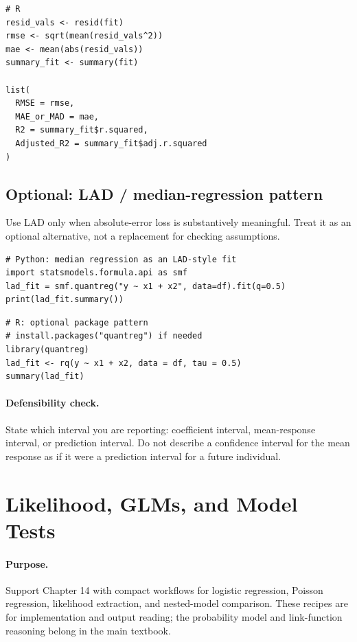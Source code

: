 \begin{verbatim}
# R
resid_vals <- resid(fit)
rmse <- sqrt(mean(resid_vals^2))
mae <- mean(abs(resid_vals))
summary_fit <- summary(fit)

list(
  RMSE = rmse,
  MAE_or_MAD = mae,
  R2 = summary_fit$r.squared,
  Adjusted_R2 = summary_fit$adj.r.squared
)
\end{verbatim}

\subsection*{Optional: LAD / median-regression pattern}

Use LAD only when absolute-error loss is substantively meaningful.  Treat it as an optional alternative, not a replacement for checking assumptions.

\begin{verbatim}
# Python: median regression as an LAD-style fit
import statsmodels.formula.api as smf
lad_fit = smf.quantreg("y ~ x1 + x2", data=df).fit(q=0.5)
print(lad_fit.summary())
\end{verbatim}

\begin{verbatim}
# R: optional package pattern
# install.packages("quantreg") if needed
library(quantreg)
lad_fit <- rq(y ~ x1 + x2, data = df, tau = 0.5)
summary(lad_fit)
\end{verbatim}

\paragraph{Defensibility check.} State which interval you are reporting: coefficient interval, mean-response interval, or prediction interval.  Do not describe a confidence interval for the mean response as if it were a prediction interval for a future individual.

\section{Likelihood, GLMs, and Model Tests}
\label{app:cookbook-likelihood-glms-model-tests}

\paragraph{Purpose.} Support Chapter 14 with compact workflows for logistic regression, Poisson regression, likelihood extraction, and nested-model comparison.  These recipes are for implementation and output reading; the probability model and link-function reasoning belong in the main textbook.

